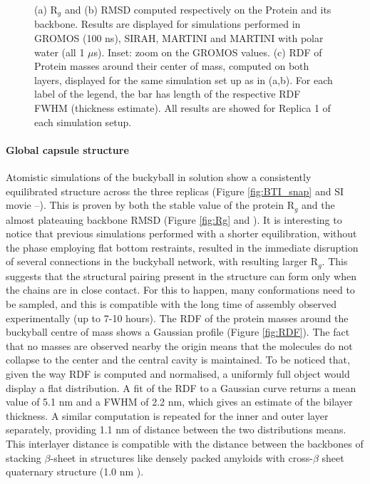 \begin{figure}[p!]
\caption[Structural measures on buckyball in solution]{(a) R$_g$ and (b) RMSD computed respectively on the Protein and its backbone. Results are displayed for simulations performed in GROMOS (100 ns), SIRAH, MARTINI and MARTINI with polar water (all 1 $\mu$s). Inset: zoom on the GROMOS values. (c) RDF of Protein masses around their center of mass, computed on both layers, displayed for the same simulation set up as in (a,b). For each label of the legend, the bar has length of the respective RDF FWHM (thickness estimate). All results are showed for Replica 1 of each simulation setup.}
\label{fig:struct_UA_SIhere}
\end{figure}
%
\paragraph{Global capsule structure} Atomistic simulations of the buckyball in solution show a consistently equilibrated structure across the three replicas (Figure \ref{fig:BTI_snap} and SI movie --).
%
This is proven by both the stable value of the protein R$_g$ and the almost plateauing backbone RMSD (Figure \ref{fig:Rg} and ). It is interesting to notice that previous simulations performed with a shorter equilibration, without the phase employing flat bottom restraints, resulted in the immediate disruption of several connections in the buckyball network, with resulting larger R$_g$. This suggests that the structural pairing present in the structure can form only when the chains are in close contact. For this to happen, many conformations need to be sampled, and this is compatible with the long time of assembly observed experimentally (up to 7-10 hours).
%
The RDF of the protein masses around the buckyball centre of mass shows a Gaussian profile (Figure \ref{fig:RDF}). The fact that no masses are observed nearby the origin means that the molecules do not collapse to the center and the central cavity is maintained. To be noticed that, given the way RDF is computed and normalised, a uniformly full object would display a flat distribution.
%
A fit of the RDF to a Gaussian curve returns a mean value of 5.1 nm and a FWHM of 2.2 nm, which gives an estimate of the bilayer thickness.
%
A similar computation is repeated for the inner and outer layer separately, providing 1.1 nm of distance between the two distributions means. This interlayer distance is compatible with the distance between the backbones of stacking $\beta$-sheet in structures like densely packed amyloids with cross-$\beta$ sheet quaternary structure (1.0 nm \cite{Sunde1997}).

